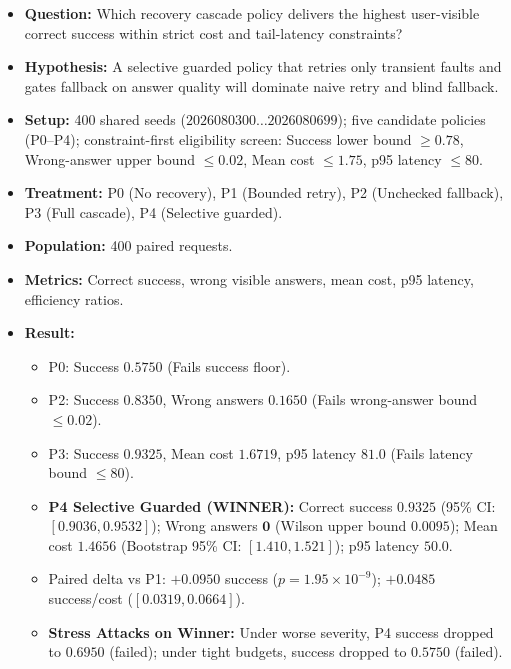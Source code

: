 \begin{itemize}\setlength{\itemsep}{1.2pt}\setlength{\parsep}{0pt}\setlength{\parskip}{0pt}
    \item \textbf{Question:} Which recovery cascade policy delivers the highest user-visible correct success within strict cost and tail-latency constraints?
    \item \textbf{Hypothesis:} A selective guarded policy that retries only transient faults and gates fallback on answer quality will dominate naive retry and blind fallback.
    \item \textbf{Setup:} 400 shared seeds ($2026080300 \dots 2026080699$); five candidate policies (P0--P4); constraint-first eligibility screen: Success lower bound $\ge 0.78$, Wrong-answer upper bound $\le 0.02$, Mean cost $\le 1.75$, p95 latency $\le 80$.
    \item \textbf{Treatment:} P0 (No recovery), P1 (Bounded retry), P2 (Unchecked fallback), P3 (Full cascade), P4 (Selective guarded).
    \item \textbf{Population:} 400 paired requests.
    \item \textbf{Metrics:} Correct success, wrong visible answers, mean cost, p95 latency, efficiency ratios.
    \item \textbf{Result:} \MEASURED
    \begin{itemize}\setlength{\itemsep}{0.8pt}\setlength{\parsep}{0pt}
        \item P0: Success $0.5750$ (Fails success floor).
        \item P2: Success $0.8350$, Wrong answers $\mathbf{0.1650}$ (Fails wrong-answer bound $\le 0.02$).
        \item P3: Success $0.9325$, Mean cost $1.6719$, p95 latency $\mathbf{81.0}$ (Fails latency bound $\le 80$).
        \item \textbf{P4 Selective Guarded (WINNER):} Correct success $\mathbf{0.9325}$ (95\% CI: $[0.9036, 0.9532]$); Wrong answers $\mathbf{0}$ (Wilson upper bound $\mathbf{0.0095}$); Mean cost $\mathbf{1.4656}$ (Bootstrap 95\% CI: $[1.410, 1.521]$); p95 latency $\mathbf{50.0}$.
        \item Paired delta vs P1: $+0.0950$ success ($p = 1.95 \times 10^{-9}$); $+0.0485$ success/cost ($[0.0319, 0.0664]$).
        \item \textbf{Stress Attacks on Winner:} Under worse severity, P4 success dropped to $\mathbf{0.6950}$ (failed); under tight budgets, success dropped to $\mathbf{0.5750}$ (failed).
    \end{itemize}

\end{itemize}
